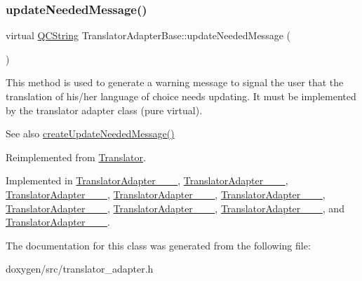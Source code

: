 \subsubsection{\texorpdfstring{updateNeededMessage()}{updateNeededMessage()}}
{\footnotesize\ttfamily virtual \mbox{\hyperlink{class_q_c_string}{Q\+C\+String}} Translator\+Adapter\+Base\+::update\+Needed\+Message (\begin{DoxyParamCaption}{ }\end{DoxyParamCaption})\hspace{0.3cm}{\ttfamily [pure virtual]}}

This method is used to generate a warning message to signal the user that the translation of his/her language of choice needs updating. It must be implemented by the translator adapter class (pure virtual).

\begin{DoxySeeAlso}{See also}
\mbox{\hyperlink{class_translator_adapter_base_a71493b87a34d6e4c232e540734aba698}{create\+Update\+Needed\+Message()}} 
\end{DoxySeeAlso}


Reimplemented from \mbox{\hyperlink{class_translator_a8841e027d8a0e661d0cef7e06d75c22a}{Translator}}.



Implemented in \mbox{\hyperlink{class_translator_adapter__1__4__6_ab19b01d4e00c95ef1e6eb631fbe6ada4}{Translator\+Adapter\+\_\+\_\+\_}}, \mbox{\hyperlink{class_translator_adapter__1__5__4_a587a31dad925e47f206b6a0cda9eedd0}{Translator\+Adapter\+\_\+\_\+\_}}, \mbox{\hyperlink{class_translator_adapter__1__6__0_abc231eb2c1864ca9f878e7e5deb94f54}{Translator\+Adapter\+\_\+\_\+\_}}, \mbox{\hyperlink{class_translator_adapter__1__6__3_ab3d79abfb926c41bd7609eeb706654fe}{Translator\+Adapter\+\_\+\_\+\_}}, \mbox{\hyperlink{class_translator_adapter__1__7__5_a6e69d48e79a13c9d934f9af1a8befd8a}{Translator\+Adapter\+\_\+\_\+\_}}, \mbox{\hyperlink{class_translator_adapter__1__8__0_a47cedb130d9a178d9c632584d4f2abec}{Translator\+Adapter\+\_\+\_\+\_}}, \mbox{\hyperlink{class_translator_adapter__1__8__2_a307747456f69ab8dcb0c2be27f429e80}{Translator\+Adapter\+\_\+\_\+\_}}, \mbox{\hyperlink{class_translator_adapter__1__8__4_a87dbcf9a99bf2ddfd9593461d331b714}{Translator\+Adapter\+\_\+\_\+\_}}, and \mbox{\hyperlink{class_translator_adapter__1__8__15_a80d2ab2af345124fee8267ad82ac51ed}{Translator\+Adapter\+\_\+\_\+\_}}.



The documentation for this class was generated from the following file\+:\begin{DoxyCompactItemize}
\item 
doxygen/src/translator\+\_\+adapter.\+h\end{DoxyCompactItemize}
